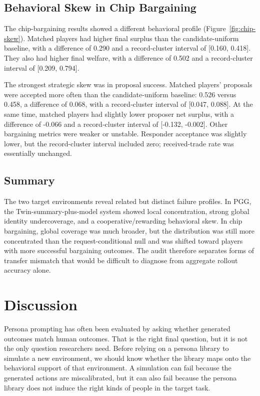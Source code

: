 \documentclass[11pt]{article}
\begin{document}
\subsection{Behavioral Skew in Chip Bargaining}

The chip-bargaining results showed a different behavioral profile (Figure~\ref{fig:chip-skew}). Matched players had higher final surplus than the candidate-uniform baseline, with a difference of 0.290 and a record-cluster interval of [0.160, 0.418]. They also had higher final welfare, with a difference of 0.502 and a record-cluster interval of [0.209, 0.794].

The strongest strategic skew was in proposal success. Matched players' proposals were accepted more often than the candidate-uniform baseline: 0.526 versus 0.458, a difference of 0.068, with a record-cluster interval of [0.047, 0.088]. At the same time, matched players had slightly lower proposer net surplus, with a difference of -0.066 and a record-cluster interval of [-0.132, -0.002]. Other bargaining metrics were weaker or unstable. Responder acceptance was slightly lower, but the record-cluster interval included zero; received-trade rate was essentially unchanged.

\subsection{Summary}

The two target environments reveal related but distinct failure profiles. In PGG, the Twin-summary-plus-model system showed local concentration, strong global identity undercoverage, and a cooperative/rewarding behavioral skew. In chip bargaining, global coverage was much broader, but the distribution was still more concentrated than the request-conditional null and was shifted toward players with more successful bargaining outcomes. The audit therefore separates forms of transfer mismatch that would be difficult to diagnose from aggregate rollout accuracy alone.

\section{Discussion}

Persona prompting has often been evaluated by asking whether generated outcomes match human outcomes. That is the right final question, but it is not the only question researchers need. Before relying on a persona library to simulate a new environment, we should know whether the library maps onto the behavioral support of that environment. A simulation can fail because the generated actions are miscalibrated, but it can also fail because the persona library does not induce the right kinds of people in the target task.
\end{document}
